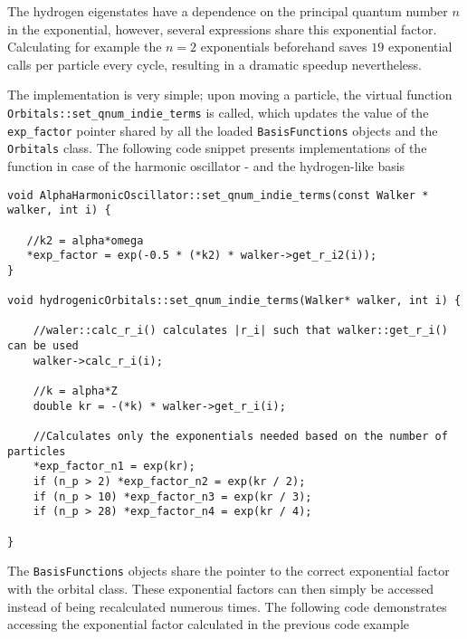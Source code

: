 The hydrogen eigenstates have a dependence on the principal quantum number $n$ in the exponential, however, several expressions share this exponential factor. Calculating for example the $n=2$ exponentials beforehand saves $19$ exponential calls per particle every cycle, resulting in a dramatic speedup nevertheless.

The implementation is very simple; upon moving a particle, the virtual function \verb+Orbitals::set_qnum_indie_terms+ is called, which updates the value of the \verb+exp_factor+  pointer shared by all the loaded \verb+BasisFunctions+ objects and the \verb+Orbitals+ class. The following code snippet presents implementations of the function in case of the harmonic oscillator - and the hydrogen-like basis


\vspace{0.5cm}
\begin{lstlisting}[caption={Implementation of the function handling the calculation of the quantum number independent terms. Lines 1-5 describe the harmonic oscillator case, where the exponential factor $\exp(-\alpha\omega r_i^2)$ is the independent factor. Lines 7-21 describe the hydrogen-like case, where the calculated exponential factor $\exp(-\alpha Z |r_i|/n)$ has a dependence on the principal quantum number $n$. One factor is thus calculated per $n$, however, if no particles occupy states with a given $n$, the corresponding factor is not calculated (see lines 17-19). }]
void AlphaHarmonicOscillator::set_qnum_indie_terms(const Walker * walker, int i) {
   
   //k2 = alpha*omega 
   *exp_factor = exp(-0.5 * (*k2) * walker->get_r_i2(i));
}

void hydrogenicOrbitals::set_qnum_indie_terms(Walker* walker, int i) {

    //waler::calc_r_i() calculates |r_i| such that walker::get_r_i() can be used
    walker->calc_r_i(i);

    //k = alpha*Z 
    double kr = -(*k) * walker->get_r_i(i);
    
    //Calculates only the exponentials needed based on the number of particles
    *exp_factor_n1 = exp(kr);
    if (n_p > 2) *exp_factor_n2 = exp(kr / 2);
    if (n_p > 10) *exp_factor_n3 = exp(kr / 3);
    if (n_p > 28) *exp_factor_n4 = exp(kr / 4);

}
\end{lstlisting}

The \verb+BasisFunctions+ objects share the pointer to the correct exponential factor with the orbital class. These exponential factors can then simply be accessed instead of being recalculated numerous times. The following code demonstrates accessing the exponential factor calculated in the previous code example

